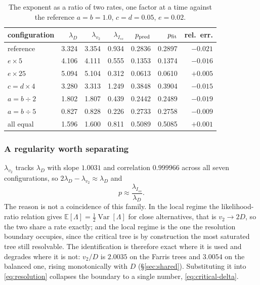 \documentclass[preprint,12pt,authoryear]{elsarticle}
\newcommand{\Iss}{I_{ss}}
\newcommand{\E}{\mathbb{E}}
\newcommand{\Var}{\operatorname{Var}}
\newcommand{\lam}[1]{\lambda_{#1}}
\theoremstyle{definition}
\theoremstyle{remark}
\begin{document}
\begin{table}[t]
\centering
\caption{The exponent as a ratio of two rates, one factor at a time against
the reference $a=b=1.0$, $c=d=0.05$, $e=0.02$.}
\label{tab:factors}
\begin{tabular}{lrrrrrr}
\toprule
configuration & $\lam D$ & $\lam{v_2}$ & $\lam{\Iss}$
  & $p_{\rm pred}$ & $p_{\rm fit}$ & rel.\ err. \\
\midrule
reference          & 3.324 & 3.354 & 0.934 & 0.2836 & 0.2897 & $-0.021$ \\
$e\times5$         & 4.106 & 4.111 & 0.555 & 0.1353 & 0.1374 & $-0.016$ \\
$e\times25$        & 5.094 & 5.104 & 0.312 & 0.0613 & 0.0610 & $+0.005$ \\
$c=d\times4$       & 3.280 & 3.313 & 1.249 & 0.3848 & 0.3904 & $-0.015$ \\
$a=b\div2$         & 1.802 & 1.807 & 0.439 & 0.2442 & 0.2489 & $-0.019$ \\
$a=b\div5$         & 0.827 & 0.828 & 0.226 & 0.2733 & 0.2758 & $-0.009$ \\
all equal          & 1.596 & 1.600 & 0.811 & 0.5089 & 0.5085 & $+0.001$ \\
\bottomrule
\end{tabular}
\end{table}

\subsubsection{A regularity worth separating}

$\lam{v_2}$ tracks $\lam D$ with slope $1.0031$ and correlation $0.999966$
across all seven configurations, so $2\lam D-\lam{v_2}\approx\lam D$
and
\begin{equation}
p\approx\frac{\lam{\Iss}}{\lam D} .
\end{equation}
The reason is not a coincidence of this family. In the local regime the
likelihood-ratio relation gives $\E[\Lambda]=\frac12\Var[\Lambda]$ for close
alternatives, that is $v_2\to2D$, so the two share a rate exactly; and
the local regime is the one the resolution boundary occupies, since the
critical tree is by construction the most saturated tree still resolvable.
The identification is therefore exact where it is used and degrades where it
is not: $v_2/D$ is $2.0035$ on the Farris trees and $3.0054$ on the
balanced one, rising monotonically with $D$ (\S\ref{sec:shared}).
Substituting it into \eqref{eq:resolution} collapses the boundary to a single
number, \eqref{eq:critical-delta}.
\end{document}
